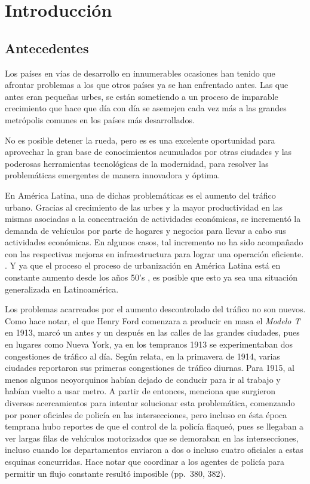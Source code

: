 
\chapter{Introducción} %
\graphicspath{{../imagenes/}}
\linespread{1.3}
\hypertarget{antecedentes}{%
\section{Antecedentes}\label{antecedentes}}

Los países en vías de desarrollo en innumerables ocasiones han tenido
que afrontar problemas a los que otros países ya se han enfrentado
antes. Las que antes eran pequeñas urbes, se están sometiendo a un
proceso de imparable crecimiento que hace que día con día se asemejen
cada vez más a las grandes metrópolis comunes en los países más
desarrollados.

No es posible detener la rueda, pero es es una excelente oportunidad
para aprovechar la gran base de conocimientos acumulados por otras
ciudades y las poderosas herramientas tecnológicas de la modernidad,
para resolver las problemáticas emergentes de manera innovadora y
óptima.

En América Latina, una de dichas problemáticas es el aumento del tráfico
urbano. Gracias al crecimiento de las urbes y la mayor productividad en
las mismas asociadas a la concentración de actividades económicas, se
incrementó la demanda de vehículos por parte de hogares y negocios para
llevar a cabo sus actividades económicas. En algunos casos, tal
incremento no ha sido acompañado con las respectivas mejoras en
infraestructura para lograr una operación eficiente.
\parencite[1]{Medina-Durango2011}. Y ya que el proceso el proceso de
urbanización en América Latina está en constante aumento desde los años
50's \parencite[27]{PdaCunha2009}, es posible que esto ya sea una
situación generalizada en Latinoamérica.

Los problemas acarreados por el aumento descontrolado del tráfico no son
nuevos. Como \textcite{McShane1999} hace notar, el que Henry Ford
comenzara a producir en masa el \emph{Modelo T} en 1913, marcó un antes
y un después en las calles de las grandes ciudades, pues en lugares como
Nueva York, ya en los tempranos 1913 se experimentaban dos congestiones
de tráfico al día. Según relata, en la primavera de 1914, varias
ciudades reportaron sus primeras congestiones de tráfico diurnas. Para
1915, al menos algunos neoyorquinos habían dejado de conducir para ir al
trabajo y habían vuelto a usar metro. A partir de entonces, menciona que
surgieron diversos acercamientos para intentar solucionar esta
problemática, comenzando por poner oficiales de policía en las
intersecciones, pero incluso en ésta época temprana hubo reportes de que
el control de la policía flaqueó, pues se llegaban a ver largas filas de
vehículos motorizados que se demoraban en las intersecciones, incluso
cuando los departamentos enviaron a dos o incluso cuatro oficiales a
estas esquinas concurridas. Hace notar que coordinar a los agentes de
policía para permitir un flujo constante resultó imposible (pp.~380,
382).


